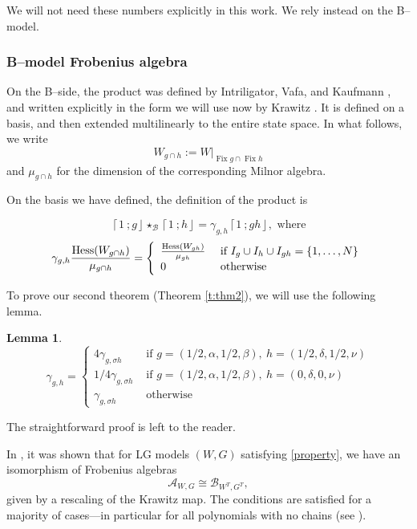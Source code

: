 \documentclass[10pt, letterpaper]{amsart}
\newtheorem{lem}[thm]{Lemma}
\theoremstyle{remark}
\newcommand{\sA}{\mathscr{A}}
\newcommand{\sB}{\mathscr{B}}
\newcommand{\fjrw}[2]{ \left\lceil #1 \:; #2 \right\rfloor }
\DeclareMathOperator{\Hess}{Hess}
\DeclareMathOperator{\Fix}{Fix}
\begin{document}
We will not need these numbers explicitly in this work. We rely instead on the B--model. 


\subsubsection{B--model Frobenius algebra}
On the B--side, the product was defined by Intriligator, Vafa, and Kaufmann \cite{IV, kau1,kau2,kau3}, and written explicitly in the form we will use now by Krawitz \cite{Kr}. It is defined on a basis, and then extended multilinearly to the entire state space. In what follows, we write 
\[
W_{g\cap h}:= W|_{\Fix g \cap \Fix h}
\]
and $\mu_{g\cap h}$ for the dimension of the corresponding Milnor algebra. 

On the basis we have defined, the definition of the product is 

\[
\fjrw{1}{g}\star_{\sB} \fjrw{1}{h} = \gamma_{g,h} \fjrw{1}{gh}, \text{ where}
\]
\[
\gamma_{g,h} \frac{\Hess (W_{g\cap h})}{\mu_{g\cap h}} = \left\{ \begin{array}{l l }
\frac{\Hess (W_{gh})}{\mu_{gh}} & \text{ if } I_g \cup I_h \cup I_{gh} = \{1, \ldots, N\}\\
0 & \text{ otherwise} \\ \end{array}\right.
\]

To prove our second theorem (Theorem \ref{t:thm2}), we will use the following lemma. 

\begin{lem}\label{lem:gamma_relations}
\[
\gamma_{g,h} = \left\{ 
\begin{array}{ll}
4 \gamma_{g, \sigma h} & \text{ if } g = (1/2, \alpha, 1/2, \beta),\ h = (1/2, \delta, 1/2, \nu)\\
1/4 \gamma_{g, \sigma h} & \text{ if } g = (1/2, \alpha, 1/2, \beta),\ h = (0, \delta, 0, \nu)\\
 \gamma_{g, \sigma h} & \text{ otherwise} \end{array}\right.
\]
\end{lem}
The straightforward proof is left to the reader. 

In \cite{FJJS}, it was shown that for LG models $(W,G)$ satisfying \autoref{property}, we have an isomorphism of Frobenius algebras
\[
\sA_{W,G}\cong \sB_{W^T,G^T}, 
\]
given by a rescaling of the Krawitz map. 
The conditions are satisfied for a majority of cases---in particular for all polynomials with no chains (see \cite[Remark 1.1.1]{FJJS}).  
\end{document}

